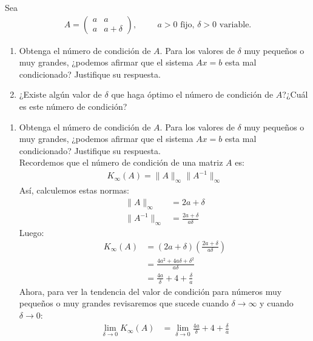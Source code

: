 \begin{homeworkProblem}
  Sea
  \begin{align*}
    A=\begin{pmatrix}
      a & a \\
      a & a+\delta
    \end{pmatrix},
    \hspace{1cm}a>0\text{ fijo, } \delta>0 \text{ variable.}
  \end{align*}
  \begin{enumerate}
    \item Obtenga el número de condición de $A$. Para los valores de $\delta$ muy pequeños o muy grandes, ¿podemos afirmar que el sistema $Ax=b$ esta mal condicionado? Justifique su respuesta.
    \item ¿Existe algún valor de $\delta$ que haga óptimo el número de condición de $A$?¿Cuál es este número de condición? 
  \end{enumerate}
  \begin{solucion}
    \begin{enumerate}
      \item Obtenga el número de condición de $A$. Para los valores de $\delta$ muy pequeños o muy grandes, ¿podemos afirmar que el sistema $Ax=b$ esta mal condicionado? Justifique su respuesta.\\
        Recordemos que el número de condición de una matriz $A$ es:
        \begin{align*}
          K_{\infty}(A)=\|A\|_{\infty}\|A^{-1}\|_{\infty}
        \end{align*}
        Así, calculemos estas normas:
        \begin{align*}
          \|A\|_{\infty}&= 2a+\delta\\
          \|A^{-1}\|_{\infty}&=\frac{2a+\delta}{a\delta}
        \end{align*}
        Luego:
        \begin{align*}
          K_\infty(A)&=(2a+\delta)\left( \frac{2a+\delta}{a\delta} \right)\\
          &=\frac{4a^2+4a\delta+\delta^2}{a\delta}\\
          &=\frac{4a}{\delta}+4+\frac{\delta}{a}
        \end{align*}
        Ahora, para ver la tendencia del valor de condición para números muy pequeños o muy grandes revisaremos que sucede cuando $\delta\to\infty$ y cuando $\delta\to 0$:
        \begin{align*}
          \lim_{\delta \to 0}K_\infty(A)&=\lim_{\delta \to 0}\frac{4a}{\delta}+4+\frac{\delta}{a}\\

\end{align*}
\end{enumerate}
\end{solucion}
\end{homeworkProblem}
